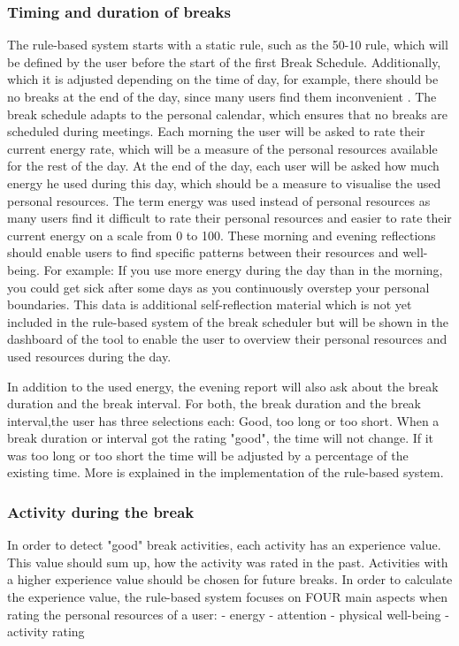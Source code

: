 \documentclass{hasel_thesis}
\begin{document}
\subsubsection{Timing and duration of breaks}
The rule-based system starts with a static rule, such as the 50-10 rule, which will be defined by the user before the start of the first Break Schedule. Additionally, which it is adjusted depending on the time of day, for example, there should be no breaks at the end of the day, since many users find them inconvenient \cite{KimS.ParkY.&Niu.2017}. The break schedule adapts to the personal calendar, which ensures that no breaks are scheduled during meetings. 
Each morning the user will be asked to rate their current energy rate, which will be a measure of the personal resources available for the rest of the day.  At the end of the day, each user will be asked how much energy he used during this day, which should be a measure to visualise the used personal resources. The term energy was used instead of personal resources as many users find it difficult to rate their personal resources and easier to rate their current energy on a scale from 0 to 100. These morning and evening reflections should enable users to find specific patterns between their resources and well-being. For example: If you use more energy during the day than in the morning, you could get sick after some days as you continuously overstep your personal boundaries. This data is additional self-reflection material which is not yet included in the rule-based system of the break scheduler but will be shown in the dashboard of the tool to enable the user to overview their personal resources and used resources during the day.


In addition to the used energy, the evening report will also ask about the break duration and the break interval. For both, the break duration and the break interval,the user has three selections each: Good, too long or too short. When a break duration or interval got the rating "good", the time will not change. If it was too long or too short the time will be adjusted by a percentage of the existing time. More is explained in the implementation of the rule-based system.


\subsubsection{Activity during the break}
In order to detect "good" break activities, each activity has an experience value. This value should sum up, how the activity was rated in the past. Activities with a higher experience value should be chosen for future breaks. In order to calculate the experience value, the rule-based system  focuses on FOUR main aspects when rating the personal resources of a user:
- energy
- attention
- physical well-being
- activity rating
\end{document}

